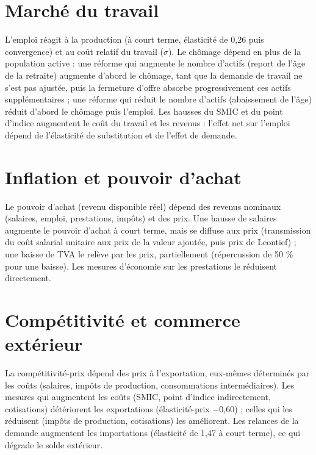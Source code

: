 \documentclass[
  11pt,
  11pt,
  a4paper,
  openany]{book}
\begin{document}
\hypertarget{sec:travail-transmission}{%
\section{Marché du travail}\label{sec:travail-transmission}}

L'emploi réagit à la production (à court terme, élasticité de 0,26 puis
convergence) et au coût relatif du travail (\(\sigma\)). Le chômage
dépend en plus de la population active : une réforme qui augmente le
nombre d'actifs (report de l'âge de la retraite) augmente d'abord le
chômage, tant que la demande de travail ne s'est pas ajustée, puis la
fermeture d'offre absorbe progressivement ces actifs supplémentaires ;
une réforme qui réduit le nombre d'actifs (abaissement de l'âge) réduit
d'abord le chômage puis l'emploi. Les hausses du SMIC et du point
d'indice augmentent le coût du travail et les revenus : l'effet net sur
l'emploi dépend de l'élasticité de substitution et de l'effet de
demande.

\hypertarget{sec:inflation-pa}{%
\section{Inflation et pouvoir d'achat}\label{sec:inflation-pa}}

Le pouvoir d'achat (revenu disponible réel) dépend des revenus nominaux
(salaires, emploi, prestations, impôts) et des prix. Une hausse de
salaires augmente le pouvoir d'achat à court terme, mais se diffuse aux
prix (transmission du coût salarial unitaire aux prix de la valeur
ajoutée, puis prix de Leontief) ; une baisse de TVA le relève par les
prix, partiellement (répercussion de 50 \% pour une baisse). Les mesures
d'économie sur les prestations le réduisent directement.

\hypertarget{sec:competitivite}{%
\section{Compétitivité et commerce extérieur}\label{sec:competitivite}}

La compétitivité-prix dépend des prix à l'exportation, eux-mêmes
déterminés par les coûts (salaires, impôts de production, consommations
intermédiaires). Les mesures qui augmentent les coûts (SMIC, point
d'indice indirectement, cotisations) détériorent les exportations
(élasticité-prix −0,60) ; celles qui les réduisent (impôts de
production, cotisations) les améliorent. Les relances de la demande
augmentent les importations (élasticité de 1,47 à court terme), ce qui
dégrade le solde extérieur.
\end{document}
